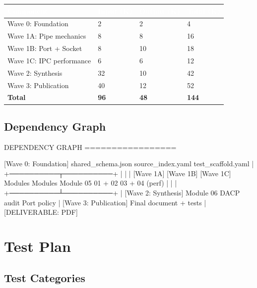 \documentclass[11pt,letterpaper]{article}
\newcommand{\tableheader}[1]{\textbf{\sffamily\textcolor{white}{#1}}}
\begin{document}
\begin{center}
\begin{tabularx}{\textwidth}{L{4cm}C{2cm}C{2cm}C{2cm}}
\toprule
{}
\tableheader{Component} & \tableheader{Input (K)} & \tableheader{Output (K)} & \tableheader{Total (K)} \\
\midrule
Wave 0: Foundation & 2 & 2 & 4 \\
Wave 1A: Pipe mechanics & 8 & 8 & 16 \\
Wave 1B: Port + Socket & 8 & 10 & 18 \\
Wave 1C: IPC performance & 6 & 6 & 12 \\
Wave 2: Synthesis & 32 & 10 & 42 \\
Wave 3: Publication & 40 & 12 & 52 \\
\midrule
\textbf{Total} & \textbf{96} & \textbf{48} & \textbf{144} \\
\bottomrule
\end{tabularx}
\end{center}

\subsection{Dependency Graph}

\begin{asciibox}
DEPENDENCY GRAPH
=================

[Wave 0: Foundation]
  shared_schema.json
  source_index.yaml
  test_scaffold.yaml
        |
        +──────────┬──────────+
        |          |          |
   [Wave 1A]  [Wave 1B]  [Wave 1C]
   Modules    Modules    Module 05
   01 + 02    03 + 04    (perf)
        |          |          |
        +──────────┴──────────+
                   |
           [Wave 2: Synthesis]
              Module 06
              DACP audit
              Port policy
                   |
           [Wave 3: Publication]
           Final document + tests
                   |
           [DELIVERABLE: PDF]
\end{asciibox}

\section{Test Plan}

\subsection{Test Categories}
\end{document}

